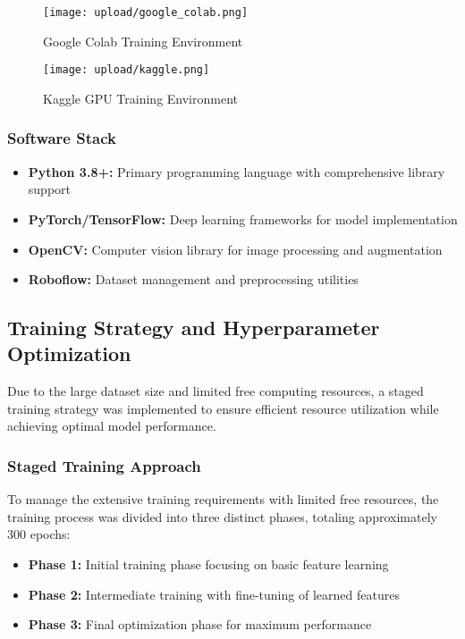 \documentclass[12pt,a4paper]{report}
\begin{document}
\begin{figure}[H]
    \centering
    \begin{minipage}{0.45\textwidth}
        \centering
        \texttt{[image: upload/google\_colab.png]}
        \caption{Google Colab Training Environment}
        \label{fig:colab_training}
    \end{minipage}
    \hfill
    \begin{minipage}{0.45\textwidth}
        \centering
        \texttt{[image: upload/kaggle.png]}
        \caption{Kaggle GPU Training Environment}
        \label{fig:kaggle_training}
    \end{minipage}
\end{figure}

\subsubsection{Software Stack}
\begin{itemize}
    \item \textbf{Python 3.8+:} Primary programming language with comprehensive library support
    \item \textbf{PyTorch/TensorFlow:} Deep learning frameworks for model implementation
    \item \textbf{OpenCV:} Computer vision library for image processing and augmentation
    \item \textbf{Roboflow:} Dataset management and preprocessing utilities
\end{itemize}

\subsection{Training Strategy and Hyperparameter Optimization}

Due to the large dataset size and limited free computing resources, a staged training strategy was implemented to ensure efficient resource utilization while achieving optimal model performance.

\subsubsection{Staged Training Approach}

To manage the extensive training requirements with limited free resources, the training process was divided into three distinct phases, totaling approximately 300 epochs:

\begin{itemize}
    \item \textbf{Phase 1:} Initial training phase focusing on basic feature learning
    \item \textbf{Phase 2:} Intermediate training with fine-tuning of learned features
    \item \textbf{Phase 3:} Final optimization phase for maximum performance
\end{itemize}
\end{document}
